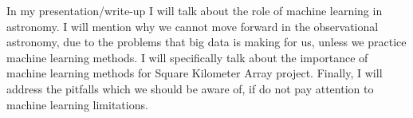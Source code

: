 \documentclass{report}
\begin{document}
In my presentation/write-up I will talk about the role of machine learning in astronomy. 
I will mention why we cannot move forward in the observational astronomy, due to the problems that big data is making for us,
 unless we practice machine learning methods. I will specifically talk about the importance of machine learning methods for 
 Square Kilometer Array project.  Finally, I will address the pitfalls which we should be aware of, if do not pay attention 
 to machine learning limitations. 
    
\end{document}
